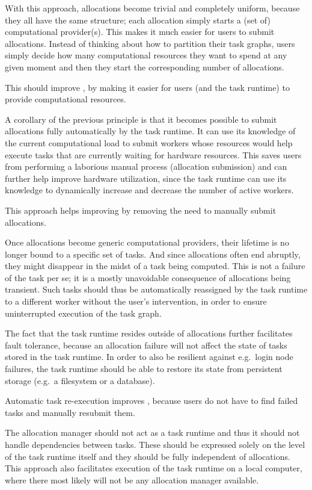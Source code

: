 \begin{description}[wide=0pt]
		With this approach, allocations become trivial and completely uniform, because they all have the
		same structure; each allocation simply starts a (set of) computational provider(s). This makes it
		much easier for users to submit allocations. Instead of thinking about how to partition their task
		graphs, users simply decide how many computational resources they want to spend at any given moment
		and then they start the corresponding number of allocations.

		This should improve \ergonomics{}, by making it easier for users (and the task runtime) to
		provide computational resources.
	\item[Allocations are submittable automatically] A corollary of the previous principle is that it becomes possible to submit allocations fully
		automatically by the task runtime. It can use its knowledge of the current computational load to
		submit workers whose resources would help execute tasks that are currently waiting for hardware
		resources. This saves users from performing a laborious manual process (allocation submission) and
		can further help improve hardware utilization, since the task runtime can use its knowledge to
		dynamically increase and decrease the number of active workers.

		This approach helps improving \ergonomics{} by removing the need to manually submit
		allocations.
	\item[Failed tasks are retried automatically] Once allocations become generic computational providers, their lifetime is no longer bound to a
		specific set of tasks. And since allocations often end abruptly, they might disappear in the midst
		of a task being computed. This is not a failure of the task per se; it is a mostly unavoidable
		consequence of allocations being transient. Such tasks should thus be automatically reassigned by
		the task runtime to a different worker without the user's intervention, in order to ensure
		uninterrupted execution of the task graph.

		The fact that the task runtime resides outside of allocations further facilitates fault tolerance,
		because an allocation failure will not affect the state of tasks stored in the task runtime. In
		order to also be resilient against e.g.\ login node failures, the task runtime should be able to
		restore its state from persistent storage (e.g.\ a filesystem or a database).

		Automatic task re-execution improves \ergonomics{}, because users do not have to
		find failed tasks and manually resubmit them.
	\item[Dependencies are independent of allocations] The allocation manager should not act as a task runtime and thus it should not handle dependencies
		between tasks. These should be expressed solely on the level of the task runtime itself and they
		should be fully independent of allocations. This approach also facilitates execution of the task
		runtime on a local computer, where there most likely will not be any allocation manager available.


\end{description}
